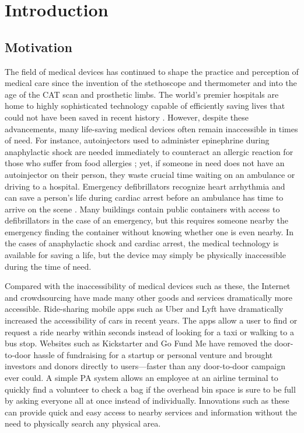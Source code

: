 \section{Introduction}

\onehalfspacing

\subsection{Motivation}

The field of medical devices has continued to shape the practice and perception of medical care since the invention of the stethoscope and thermometer and into the age of the CAT scan and prosthetic limbs. The world's premier hospitals are home to highly sophisticated technology capable of efficiently saving lives that could not have been saved in recent history \cite{advhosp}. However, despite these advancements, many life-saving medical devices often remain inaccessible in times of need. For instance, autoinjectors used to administer epinephrine during anaphylactic shock are needed immediately to counteract an allergic reaction for those who suffer from food allergies \cite{epifast}; yet, if someone in need does not have an autoinjector on their person, they waste crucial time waiting on an ambulance or driving to a hospital. Emergency defibrillators recognize heart arrhythmia and can save a person's life during cardiac arrest before an ambulance has time to arrive on the scene \cite{Kerber1677}. Many buildings contain public containers with access to defibrillators in the case of an emergency, but this requires someone nearby the emergency finding the container without knowing whether one is even nearby. In the cases of anaphylactic shock and cardiac arrest, the medical technology is available for saving a life, but the device may simply be physically inaccessible during the time of need.

Compared with the inaccessibility of medical devices such as these, the Internet and crowdsourcing have made many other goods and services dramatically more accessible. Ride-sharing mobile apps such as Uber and Lyft have dramatically increased the accessibility of cars in recent years. The apps allow a user to find or request a ride nearby within seconds instead of looking for a taxi or walking to a bus stop. Websites such as Kickstarter and Go Fund Me have removed the door-to-door hassle of fundraising for a startup or personal venture and brought investors and donors directly to users---faster than any door-to-door campaign ever could. A simple PA system allows an employee at an airline terminal to quickly find a volunteer to check a bag if the overhead bin space is sure to be full by asking everyone all at once instead of individually. Innovations such as these can provide quick and easy access to nearby services and information without the need to physically search any physical area.

